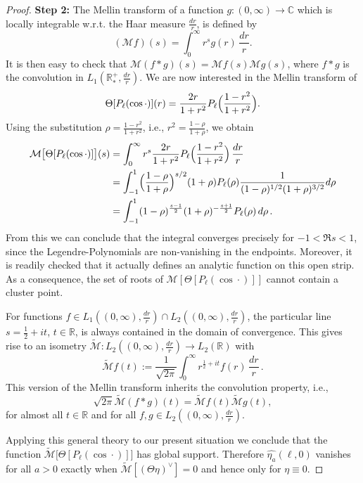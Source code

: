\documentclass[a4paper,11pt,DIV=11,%
abstract=on%
]{scrartcl}
\def\C{{\mathbb C}}
\def\R{{\mathbb R}}
\begin{document}
\begin{proof}
	\textbf{Step 2:} The Mellin transform of a function $g:(0,\infty)\rightarrow\C$ which is locally integrable
	w.r.t. the Haar measure	$\frac{dr}{r}$, is defined by
	$$(\mathcal{M}f)(s)=\int_0^\infty r^s g(r)\,\frac{dr}{r}.$$
	It is then easy to check that $\mathcal{M}(f\ast g)(s)=\mathcal{M}f(s)\mathcal{M}g(s)$, where
	$f\ast g$ is the convolution in $L_1(\R_*^+,\tfrac{dr}{r})$. We are now interested in the Mellin
	transform of
	$$\Theta[P_\ell(\cos\cdot)](r)=\frac{2r}{1+r^2}P_\ell\Bigl(\frac{1-r^2}{1+r^2}\Bigr).$$
	Using the substitution $\rho=\frac{1-r^2}{1+r^2}$, i.e., $r^2=\frac{1-\rho}{1+\rho}$, we obtain
	\begin{align*}
		\mathcal{M}\bigl[\Theta[P_\ell(\cos\cdot)]\bigr](s)
		&=\int_0^\infty r^s\frac{2r}{1+r^2}P_\ell\Bigl(\frac{1-r^2}{1+r^2}\Bigr)\,\frac{dr}{r}\\
		&=\int_{-1}^1\Bigl(\frac{1-\rho}{1+\rho}\Bigr)^{s/2}(1+\rho)
		P_\ell(\rho)\frac{1}{(1-\rho)^{1/2}(1+\rho)^{3/2}}d\rho\\
		&=\int_{-1}^1(1-\rho)^{\frac{s-1}{2}}(1+\rho)^{-\frac{s+1}{2}}P_\ell(\rho)\,d\rho\,.
	\end{align*}
	From this we can conclude that the integral converges precisely for $-1<\Re s<1$, since the
	Legendre-Polynomials are non-vanishing in the endpoints. Moreover, it is readily checked that it
	actually defines an analytic function on this open strip. As a consequence, the set of roots of
	$\mathcal{M}[\Theta[P_\ell(\cos\cdot)]]$ cannot contain a cluster point.
	
	For functions $f\in L_1((0,\infty),\frac{dr}{r})\cap L_2((0,\infty),\frac{dr}{r})$, the
	particular line $s=\frac{1}{2}+it$,	$t\in\R$, is always contained in	the domain of convergence.
	This gives rise to an isometry $\widetilde{\mathcal{M}}:L_2((0,\infty),\tfrac{dr}{r})\rightarrow L_2(\R)$ with
	$$\widetilde{\mathcal{M}}f(t)
	:=\frac{1}{\sqrt{2\pi}}\int_0^\infty r^{\frac{1}{2}+it}f(r)\,\frac{dr}{r}\,.
	$$
	This version of the Mellin transform inherits the convolution property, i.e.,
	$$\sqrt{2\pi}\widetilde{\mathcal{M}}(f\ast g)(t)
	=\widetilde{\mathcal{M}}f(t)\widetilde{\mathcal{M}}g(t),$$
	for almost all $t\in\R$ and for all $f,g\in L_2((0,\infty),\frac{dr}{r})$.
	
	Applying this general theory to our present situation we conclude that the function
	$\widetilde{\mathcal{M}}\bigl[\Theta[P_\ell(\cos\cdot)]\bigr]$ has global support.
	Therefore
	$\widehat{\eta_a}(\ell,0)$ vanishes for all $a>0$ 
	exactly when
	$\widetilde{\mathcal{M}}[(\Theta\eta)^\vee]=0$ and hence only for $\eta\equiv 0$.
\end{proof}
\end{document}
